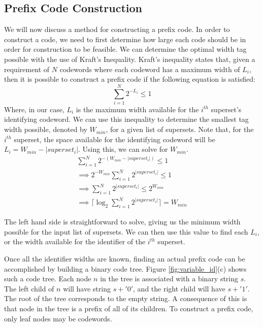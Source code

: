 \subsection{Prefix Code Construction}
We will now discuss a method for constructing a prefix code. In order to construct a code, we need to first determine how large each code should be in order for construction to be feasible. We can determine the optimal width tag possible with the use of Kraft's Inequality. Kraft's inequality states that, given a requirement of $N$ codewords where each codeword has a maximum width of $L_i$, then it is possible to construct a prefix code if the following equation is satisfied:
$$ \sum_{i = 1}^{N}{2^{-L_i} \le 1} $$
Where, in our case, $L_i$ is the maximum width available for the $i^{th}$ superset's identifying codeword. We can use this inequality to determine the smallest tag width possible, denoted by $W_{min}$, for a given list of supersets. Note that, for the $i^{th}$ superset, the space available for the identifying codeword will be $L_i = W_{min} - |superset_i|$. Using this, we can solve for $W_{min}$.\\

\begin{equation} \label{eq1}
 \begin{split}
  \sum_{i = 1}^{N}{2^{-(W_{min} - |superset_i|)}}   \le  1 \\
  \implies 2^{-W_{min}} \sum_{i = 1}^{N}{2^{|superset_i|}}   \le  1 \\
  \implies  \sum_{i = 1}^{N}{2^{|superset_i|}}   \le  2^{W_{min}} \\
 \implies   \lceil\log_2{\sum_{i = 1}^{N}{2^{|superset_i|}}}\rceil  =  W_{min}
\end{split}
 \end{equation}
 
 The left hand side is straightforward to solve, giving us the minimum width possible for the input list of supersets. We can then use this value to find each $L_i$, or the width available for the identifier of the $i^{th}$ superset.
 
 Once all the identifier widths are known, finding an actual prefix code can be accomplished by building a binary code tree. Figure \ref{fig:variable_id}(c) shows such a code tree. Each node $n$ in the tree is associated with a binary string $s$. The left child of $n$ will have string $s + '0'$, and the right child will have $s + '1'$. The root of the tree corresponds to the empty string. A consequence of this is that node in the tree is a prefix of all of its children. To construct a prefix code, only leaf nodes may be codewords. 
 
